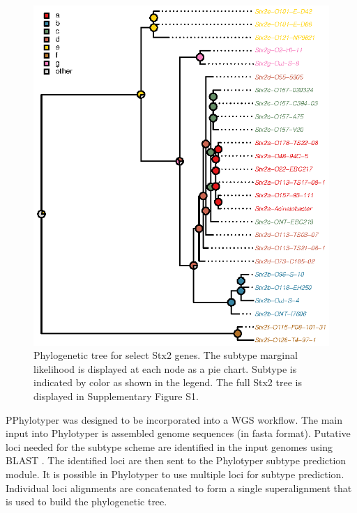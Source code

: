 \documentclass{bioinfo}
\begin{document}
\begin{figure}[!tpb]%
\centerline{\includegraphics{fig01.eps}}
\caption{Phylogenetic tree for select Stx2 genes. 
The subtype marginal likelihood is displayed at each node as a pie chart. Subtype is indicated by color as shown in the legend. The full Stx2 tree is displayed in Supplementary Figure S1.}\label{fig:01}
\end{figure}

PPhylotyper was designed to be incorporated into a WGS workflow.  
The main input into Phylotyper is assembled genome sequences (in fasta format).  
Putative loci needed for the subtype scheme are identified in the input genomes using BLAST \citep{Camacho2009}.
The identified loci are then sent to the Phylotyper subtype prediction module.
It is possible in Phylotyper to use multiple loci for subtype prediction.
Individual loci alignments are concatenated to form a single superalignment that is used to build the phylogenetic tree.
\end{document}
